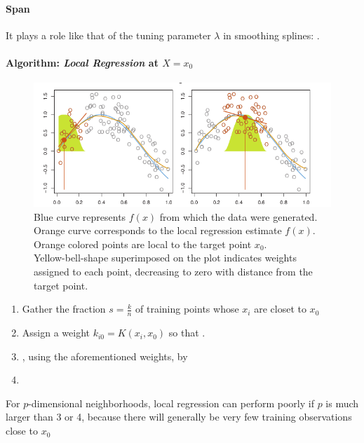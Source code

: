 \paragraph{Span}
It plays a role like that of the tuning parameter $\lambda$ in 
smoothing splines: .\\

\paragraph{Algorithm: \emph{Local Regression} at $X=x_{0}$}
\begin{figure}[H]
	\begin{center}
		\includegraphics[width=\textwidth]{./chap/1chap/6sec/images/2localRegression.png}
	\end{center}
	\caption{Blue curve represents $f(x)$ from which the data were
	generated.\\
	Orange curve corresponds to the local regression estimate $f(x)$.\\
	Orange colored points are local to the target point $x_{0}$.\\
	Yellow-bell-shape superimposed on the plot indicates weights 
	assigned to each point, decreasing to zero with distance from
	the target point.}
	\label{fig:6.1localRegression}
\end{figure}
\begin{enumerate}
	\item Gather the fraction $s=\frac{k}{n}$ of training points
		whose $x_{i}$ are closet to $x_{0}$
	\item Assign a weight $k_{i0}=K(x_{i},x_{0})$ so that .\\
	\item {}, using the aforementioned weights, by
	\item {}
\end{enumerate}
For $p$-dimensional neighborhoods, local regression can perform poorly
if $p$ is much larger than 3 or 4, because there will generally be very
few training observations close to $x_{0}$
